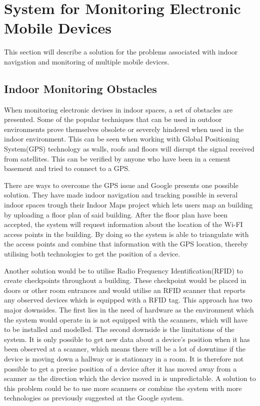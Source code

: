 \section{System for Monitoring Electronic Mobile Devices}\label{sec:monitoring}
This section will describe a solution for the problems associated with indoor navigation and monitoring of multiple mobile devices.    

\subsection{Indoor Monitoring Obstacles}
When monitoring electronic devises in indoor spaces, a set of obstacles are presented. Some of the popular techniques that can be used in outdoor environments prove themselves obsolete or severely hindered when used in the indoor environment. This can be seen when working with Global Positioning System(GPS) technology as walls, roofs and floors will disrupt the signal received from satellites. This can be verified by anyone who have been in a cement basement and tried to connect to a GPS.

There are ways to overcome the GPS issue and Google presents one possible solution. They have made indoor navigation and tracking possible in several indoor spaces trough their Indoor Maps project which lets users map an building by uploading a floor plan of said building. After the floor plan have been accepted, the system will request information about the location of the Wi-FI access points in the building. By doing so the system is able to triangulate with the access points and combine that information with the GPS location, thereby utilising both technologies to get the position of a device.

Another solution would be to utilise Radio Frequency Identification(RFID) to create checkpoints throughout a building. These checkpoint would be placed in doors or other room entrances and would utilise an RFID scanner that reports any observed devices which is equipped with a RFID tag\cite{indoor_bin}. %
This approach has two major downsides. The first lies in the need of hardware as the environment which the system would operate in is not equipped with the scanners, which will have to be installed and modelled. The second downside is the limitations of the system. It is only possible to get new data about a device's position when it has been observed at a scanner, which means there will be a lot of downtime if the device is moving down a hallway or is stationary in a room. It is therefore not possible to get a precise position of a device after it has moved away from a scanner as the direction which the device moved in is unpredictable. A solution to this problem could be to use more scanners or combine the system with more technologies as previously suggested at the Google system.

